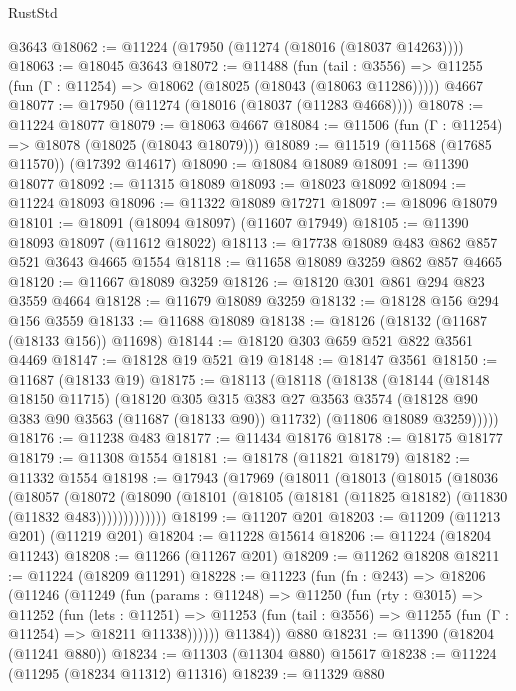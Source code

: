 \begin{lexlean}{RustStd}
\begin{coremodule}
    @3643
@18062 := @11224 (@17950 (@11274 (@18016 (@18037 @14263))))
@18063 := @18045 @3643
@18072 := @11488
    (fun (tail : @3556) => @11255 (fun (Γ : @11254) => @18062 (@18025 (@18043 (@18063 @11286)))))
    @4667
@18077 := @17950 (@11274 (@18016 (@18037 (@11283 @4668))))
@18078 := @11224 @18077
@18079 := @18063 @4667
@18084 := @11506 (fun (Γ : @11254) => @18078 (@18025 (@18043 @18079)))
@18089 := @11519 (@11568 (@17685 @11570)) (@17392 @14617)
@18090 := @18084 @18089
@18091 := @11390 @18077
@18092 := @11315 @18089
@18093 := @18023 @18092
@18094 := @11224 @18093
@18096 := @11322 @18089 @17271
@18097 := @18096 @18079
@18101 := @18091 (@18094 @18097) (@11607 @17949)
@18105 := @11390 @18093 @18097 (@11612 @18022)
@18113 := @17738 @18089 @483 @862 @857 @521 @3643 @4665 @1554
@18118 := @11658 @18089 @3259 @862 @857 @4665
@18120 := @11667 @18089 @3259
@18126 := @18120 @301 @861 @294 @823 @3559 @4664
@18128 := @11679 @18089 @3259
@18132 := @18128 @156 @294 @156 @3559
@18133 := @11688 @18089
@18138 := @18126 (@18132 (@11687 (@18133 @156)) @11698)
@18144 := @18120 @303 @659 @521 @822 @3561 @4469
@18147 := @18128 @19 @521 @19
@18148 := @18147 @3561
@18150 := @11687 (@18133 @19)
@18175 := @18113
    (@18118
      (@18138
        (@18144
          (@18148 @18150 @11715)
          (@18120
            @305
            @315
            @383
            @27
            @3563
            @3574
            (@18128 @90 @383 @90 @3563 (@11687 (@18133 @90)) @11732)
            (@11806 @18089 @3259)))))
@18176 := @11238 @483
@18177 := @11434 @18176
@18178 := @18175 @18177
@18179 := @11308 @1554
@18181 := @18178 (@11821 @18179)
@18182 := @11332 @1554
@18198 := @17943
    (@17969
      (@18011
        (@18013
          (@18015
            (@18036
              (@18057
                (@18072
                  (@18090 (@18101 (@18105 (@18181 (@11825 @18182) (@11830 (@11832 @483)))))))))))))
@18199 := @11207 @201
@18203 := @11209 (@11213 @201) (@11219 @201)
@18204 := @11228 @15614
@18206 := @11224 (@18204 @11243)
@18208 := @11266 (@11267 @201)
@18209 := @11262 @18208
@18211 := @11224 (@18209 @11291)
@18228 := @11223
    (fun (fn : @243) =>
    @18206
      (@11246
        (@11249
          (fun (params : @11248) =>
          @11250
            (fun (rty : @3015) =>
            @11252
              (fun (lets : @11251) =>
              @11253 (fun (tail : @3556) => @11255 (fun (Γ : @11254) => @18211 @11338))))))
        @11384))
    @880
@18231 := @11390 (@18204 (@11241 @880))
@18234 := @11303 (@11304 @880) @15617
@18238 := @11224 (@11295 (@18234 @11312) @11316)
@18239 := @11329 @880

\end{coremodule}
\end{lexlean}
